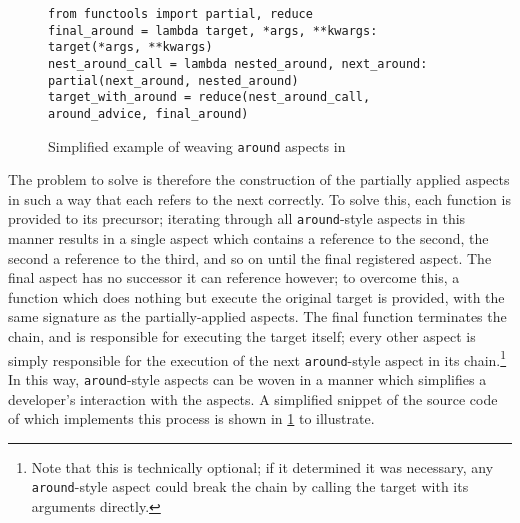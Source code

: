 \begin{figure}
    \begin{lstlisting}
from functools import partial, reduce
final_around = lambda target, *args, **kwargs: target(*args, **kwargs)
nest_around_call = lambda nested_around, next_around: partial(next_around, nested_around)
target_with_around = reduce(nest_around_call, around_advice, final_around)
    \end{lstlisting}
    \caption{Simplified example of weaving \lstinline{around} aspects in \pdsf}
    \label{fig:around_aspect_weaving_codesnippet}
\end{figure}

The problem to solve is therefore the construction of the partially applied
aspects in such a way that each refers to the next correctly. To solve this,
each function is provided to its precursor; iterating through all
\lstinline{around}-style aspects in this manner results in a single aspect which
contains a reference to the second, the second a reference to the third, and so
on until the final registered aspect. The final aspect has no successor it can
reference however; to overcome this, a function which does nothing but execute
the original target is provided, with the same signature as the
partially-applied aspects. The final function terminates the chain, and is
responsible for executing the target itself; every other aspect is simply
responsible for the execution of the next \lstinline{around}-style aspect in its
chain.\footnote{Note that this is technically optional; if it determined it was
necessary, any \lstinline{around}-style aspect could break the chain by calling
the target with its arguments directly.} In this way, \lstinline{around}-style
aspects can be woven in a manner which simplifies a developer's interaction with
the aspects. A simplified snippet of the source code of \pdsf which implements
this process is shown in \cref{fig:around_aspect_weaving_codesnippet} to
illustrate.


